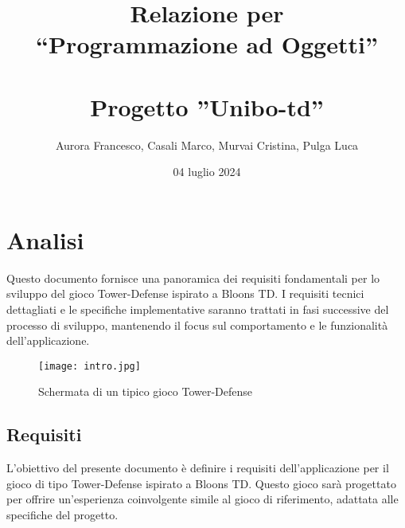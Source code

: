 \documentclass[a4paper,12pt]{report}
\title{Relazione per \\``Programmazione ad Oggetti'' \\ \\Progetto ''Unibo-td''}
\author{Aurora Francesco, Casali Marco, Murvai Cristina, Pulga Luca}
\date{04 luglio 2024}
\begin{document}
\maketitle

\tableofcontents

\chapter{Analisi}

Questo documento fornisce una panoramica dei requisiti fondamentali per lo sviluppo del gioco Tower-Defense ispirato a Bloons TD. I requisiti tecnici dettagliati e le specifiche implementative saranno trattati in fasi successive del processo di sviluppo, mantenendo il focus sul comportamento e le funzionalità dell'applicazione.

\begin{figure}[H]
    \centering
    \texttt{[image: intro.jpg]}
    \caption{Schermata di un tipico gioco Tower-Defense}
    \label{fig:enter-label}
\end{figure}


\section{Requisiti}

L'obiettivo del presente documento è definire i requisiti dell'applicazione per il gioco di tipo Tower-Defense ispirato a Bloons TD. Questo gioco sarà progettato per offrire un'esperienza coinvolgente simile al gioco di riferimento, adattata alle specifiche del progetto.
\end{document}
